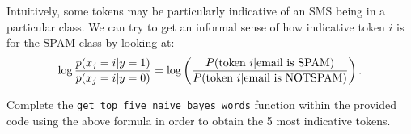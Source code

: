 \item {}
Intuitively, some tokens may be particularly indicative of an SMS being
in a particular class.  We can try to get an informal sense of how indicative
token $i$ is for the SPAM class by looking at:
\begin{equation*}
  \log \frac{p(x_j = i| y=1)}{p(x_j = i|y=0)}
  = \log\left(\frac{P(\hbox{token $i$} | \hbox{email is SPAM})}
    {P(\hbox{token $i$} | \hbox{email is NOTSPAM})}\right).
\end{equation*}

Complete the \texttt{get\_top\_five\_naive\_bayes\_words} function within the provided code using the above formula in order to obtain the 5 most indicative tokens.\\[50pt]
